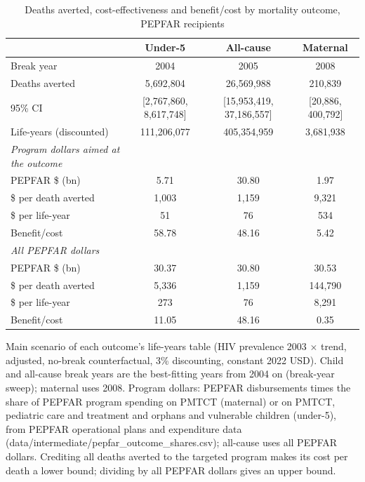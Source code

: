 \begin{table}[htbp]
\centering
\caption{Deaths averted, cost-effectiveness and benefit/cost by mortality outcome, PEPFAR recipients}
\label{tab:life_years_by_outcome}
\begin{tabular}{lccc}
\toprule
 & Under-5 & All-cause & Maternal \\
\midrule
Break year & 2004 & 2005 & 2008 \\
Deaths averted & 5,692,804 & 26,569,988 & 210,839 \\
95\% CI & [2,767,860, 8,617,748] & [15,953,419, 37,186,557] & [20,886, 400,792] \\
Life-years (discounted) & 111,206,077 & 405,354,959 & 3,681,938 \\
\textit{Program dollars aimed at the outcome} &  &  &  \\
\quad PEPFAR \$ (bn) & 5.71 & 30.80 & 1.97 \\
\quad \$ per death averted & 1,003 & 1,159 & 9,321 \\
\quad \$ per life-year & 51 & 76 & 534 \\
\quad Benefit/cost & 58.78 & 48.16 & 5.42 \\
\textit{All PEPFAR dollars} &  &  &  \\
\quad PEPFAR \$ (bn) & 30.37 & 30.80 & 30.53 \\
\quad \$ per death averted & 5,336 & 1,159 & 144,790 \\
\quad \$ per life-year & 273 & 76 & 8,291 \\
\quad Benefit/cost & 11.05 & 48.16 & 0.35 \\
\bottomrule
\end{tabular}
\par\vspace{4pt}
\begin{minipage}{\textwidth}\footnotesize Main scenario of each outcome's life-years table (HIV prevalence 2003 $\times$ trend, adjusted, no-break counterfactual, 3\% discounting, constant 2022 USD). Child and all-cause break years are the best-fitting years from 2004 on (break-year sweep); maternal uses 2008. Program dollars: PEPFAR disbursements times the share of PEPFAR program spending on PMTCT (maternal) or on PMTCT, pediatric care and treatment and orphans and vulnerable children (under-5), from PEPFAR operational plans and expenditure data (data/intermediate/pepfar\_outcome\_shares.csv); all-cause uses all PEPFAR dollars. Crediting all deaths averted to the targeted program makes its cost per death a lower bound; dividing by all PEPFAR dollars gives an upper bound. \end{minipage}
\end{table}
